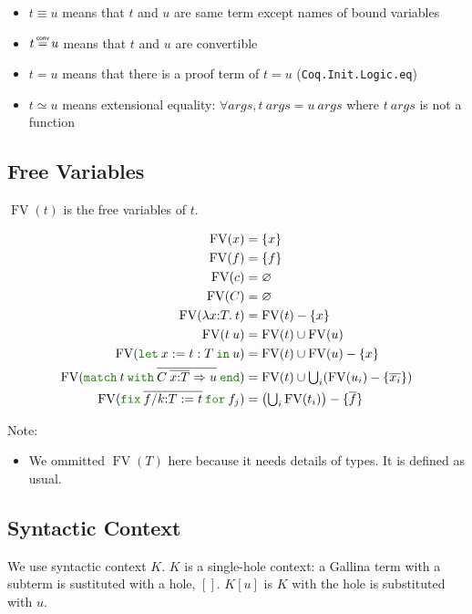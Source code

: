 \documentclass[a4paper,fleqn]{article}
\def\gallina{\textrm{Gallina}}
\newcommand\eqconv{\mathrel{\overset{\makebox[0pt]{\mbox{\normalfont\tiny\sffamily conv}}}{=}}}
\newcommand{\kwlet}{\mbox{\color{mygreen}\ttfamily let}}
\newcommand{\kwin}{\mbox{\color{mygreen}\ttfamily in}}
\newcommand{\kwmatch}{\mbox{\color{mygreen}\ttfamily match}}
\newcommand{\kwwith}{\mbox{\color{mygreen}\ttfamily with}}
\newcommand{\kwend}{\mbox{\color{mygreen}\ttfamily end}}
\newcommand{\kwfix}{\mbox{\color{mygreen}\ttfamily fix}}
\newcommand{\kwfor}{\mbox{\color{mygreen}\ttfamily for}}
\newcommand{\lamT}[3]{\lambda #1\mathord{:}#2.\:#3}
\newcommand{\letin}[3]{\kwlet\:#1:=#2\:\kwin\:#3}
\newcommand{\omatch}[2]{\kwmatch\:#1\:\kwwith\:{#2}\:\kwend}
\newcommand{\ofix}[2]{\kwfix\:{#1}\:\kwfor\:{#2}}
\DeclareMathOperator{\FV}{FV}
\newcommand{\tbigcup}{{\textstyle\bigcup}}
\newcommand{\rep}[1]{\overline{#1}}
\begin{document}
\begin{itemize}
  \item $t \equiv u$ means that $t$ and $u$ are same term except names of bound variables
  \item $t \eqconv u$ means that $t$ and $u$ are convertible
  \item $t = u$ means that there is a proof term of $t = u$ (\lstinline!Coq.Init.Logic.eq!)
  \item $t \simeq u$ means extensional equality: $\forall \mathit{args}, t\ \mathit{args} = u\ \mathit{args}$ where $t\ \mathit{args}$ is not a function
\end{itemize}

\subsection{Free Variables}

$\FV(t)$ is the free variables of $t$.

\begin{align*}
  \FV(x) &= \{x\} \\
  \FV(f) &= \{f\} \\
  \FV(c) &= \varnothing \\
  \FV(C) &= \varnothing \\
  \FV(\lamT{x}{T}{t}) &= \FV(t) - \{x\} \\
  \FV(t\:u) &= \FV(t) \cup \FV(u) \\
  \FV(\letin{x}{t:T}{u}) &= \FV(t) \cup \FV(u) - \{x\} \\
  \FV(\omatch{t}{\rep{C\:\rep{x{:}T}\Rightarrow u}}) &= \FV(t) \cup \tbigcup_i (\FV(u_i) - \{\rep{x_i}\}) \\
  \FV(\ofix{\rep{f/k{:}T:=t}}{f_j}) &= \big(\tbigcup_i \FV(t_i)\big) - \{\rep{f}\}
\end{align*}
{\small Note:
\begin{itemize}
  \item We ommitted $\FV(T)$ here because it needs details of types.  It is defined as usual.
\end{itemize}}

\subsection{Syntactic Context}

We use syntactic context $K$.
$K$ is a single-hole context: a \gallina{} term with a subterm is sustituted with a hole, $[]$.
$K[u]$ is $K$ with the hole is substituted with $u$.
\end{document}
